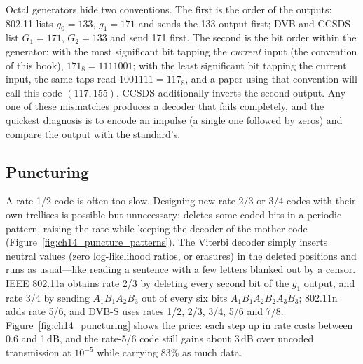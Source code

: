 \begin{pitfall}
Octal generators hide two conventions. The first is the order of the outputs: 802.11 lists
$g_0=133$, $g_1=171$ and sends the 133 output first; DVB and CCSDS list $G_1=171$, $G_2=133$ and
send 171 first. The second is the bit order within the generator: with the most significant bit
tapping the \emph{current} input (the convention of this book), $171_8=1111001$; with the least significant bit
tapping the current input, the same taps read $1001111=117_8$, and a paper using that convention
will call this code $(117,155)$. CCSDS additionally inverts the second output. Any one of these
mismatches produces a decoder that fails completely, and the quickest diagnosis is to encode an
impulse (a single one followed by zeros) and compare the output with the standard's.
\end{pitfall}

\subsection{Puncturing}

A rate-1/2 code is often too slow. Designing new rate-2/3 or 3/4 codes with their own trellises is
possible but unnecessary:  deletes some coded bits in a periodic pattern, raising the
rate while keeping the decoder of the mother code (Figure~\ref{fig:ch14_puncture_patterns}). The
Viterbi decoder simply inserts neutral values (zero log-likelihood ratios, or erasures) in the deleted
positions and runs as usual---like reading a sentence with a few letters blanked out by a censor. IEEE
802.11a obtains rate 2/3 by deleting every second bit of the $g_1$ output, and rate 3/4 by sending
$A_1B_1A_2B_3$ out of every six bits $A_1B_1A_2B_2A_3B_3$; 802.11n adds rate 5/6, and DVB-S uses
rates 1/2, 2/3, 3/4, 5/6 and 7/8. Figure~\ref{fig:ch14_puncturing} shows the price: each step up in
rate costs between 0.6 and 1\,dB, and the rate-5/6 code still gains about 3\,dB over uncoded transmission at
$10^{-5}$ while carrying 83\% as much data.



